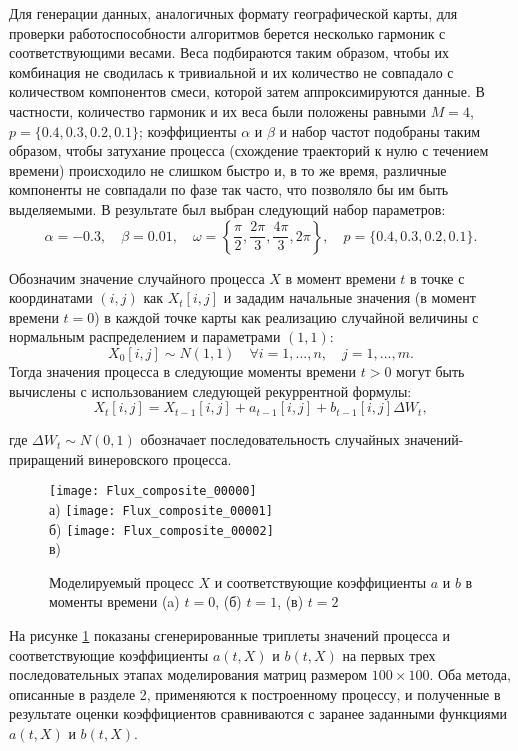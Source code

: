 Для генерации данных, аналогичных формату географической карты, для проверки работоспособности алгоритмов берется несколько гармоник с соответствующими весами. Веса подбираются таким образом, чтобы их комбинация не сводилась к тривиальной и их количество не совпадало с количеством компонентов смеси, которой затем аппроксимируются данные. В частности, количество гармоник и их веса были положены равными $M=4$, $p=\{0.4,0.3,0.2,0.1\}$; коэффициенты $\alpha$ и $\beta$ и набор частот подобраны таким образом, чтобы затухание процесса (схождение траекторий к нулю с течением времени) происходило не слишком быстро и, в то же время, различные компоненты не совпадали по фазе так часто, что позволяло бы им быть выделяемыми. В результате был выбран следующий набор параметров:
$$
\alpha = -0.3, \quad \beta = 0.01, \quad \omega = \left\{ \frac{\pi}{2}, \frac{2\pi}{3}, \frac{4\pi}{3}, 2\pi \right\}, \quad p=\{0.4, 0.3, 0.2, 0.1\}.
$$

Обозначим значение случайного процесса $X$ в момент времени $t$ в точке с координатами $(i,j)$ как $X_t[i,j]$ и зададим начальные значения (в момент времени $t=0$) в каждой точке карты как реализацию случайной величины с нормальным распределением и параметрами $(1, 1)$:
$$
X_0[i,j] \sim N(1,1) \quad \forall i=1,...,n, \quad j=1,...,m.
$$
Тогда значения процесса в следующие моменты времени $t>0$ могут быть вычислены с использованием следующей рекуррентной формулы:
$$
X_t [i,j]= X_{t-1}[i,j] + a_{t-1} [i,j] + b_{t-1}[i,j]\Delta W_t,
$$

где $\Delta W_t \sim N(0,1)$ обозначает последовательность случайных значений-приращений винеровского процесса.

\begin{figure}[!h]
	\centering
	\texttt{[image: Flux\_composite\_00000]}\\
	а)
	\texttt{[image: Flux\_composite\_00001]}\\
	б)
	\texttt{[image: Flux\_composite\_00002]}\\
	в)
	\caption{Моделируемый процесс $X$ и соответствующие коэффициенты $a$ и $b$ в моменты времени (a) $t=0$, (б) $t=1$, (в) $t=2$}
	\label{fig:flux_simulation}
\end{figure}

На рисунке \ref{fig:flux_simulation} показаны сгенерированные триплеты значений процесса и соответствующие коэффициенты $a(t,X)$ и $b(t,X)$ на первых трех последовательных этапах моделирования матриц размером $100 \times 100$. Оба метода, описанные в разделе 2, применяются к построенному процессу, и полученные в результате оценки коэффициентов сравниваются с заранее заданными функциями $a(t,X)$ и $b(t,X)$.

